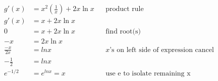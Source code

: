\documentclass{article}
\begin{document}
\begin{description}
\begin{description}
                    \begin{align*}
                        g'(x)         & = x^2\left(\frac{1}{x}\right) + 2x\ln{x} &  & \text{product rule}                            \\
                        g'(x)         & = x + 2x\ln{x}                                                                               \\
                        0             & = x + 2x\ln{x}                           &  & \text{find root(s)}                            \\
                        -x            & = 2x\ln{x}                                                                                   \\
                        \frac{-x}{2x} & = ln{x}                                  &  & \text{$x$'s on left side of expression cancel} \\
                        -\frac{1}{2}  & = ln{x}                                                                                      \\
                        e^{-1/2}      & = e^{ln{x}} = x                          &  & \text{use e to isolate remaining x}            \\
                    \end{align*}


\end{description}
\end{description}
\end{document}
